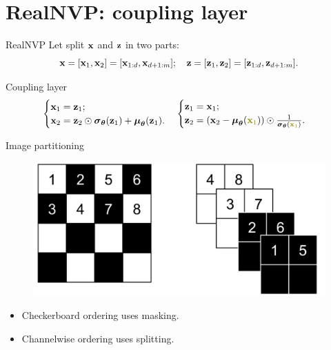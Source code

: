 \section{RealNVP: coupling layer}
\begin{frame}{RealNVP}
	\vspace{-0.5cm}
	Let split $\mathbf{x}$ and $\mathbf{z}$ in two parts: 
	\[
		\mathbf{x} = [\mathbf{x}_1, \mathbf{x}_2] = [\mathbf{x}_{1:d}, \mathbf{x}_{d+1:m}]; \quad \mathbf{z} = [\mathbf{z}_1, \mathbf{z}_2] = [\mathbf{z}_{1:d}, \mathbf{z}_{d+1:m}].
	\]
	\vspace{-0.7cm}
	\begin{block}{Coupling layer}
		\vspace{-0.7cm}
		\[
			\begin{cases} \bx_1 = \bz_1; \\ \bx_2 = \bz_2 \odot \bsigma_{\btheta}(\bz_1) + \bmu_{\btheta}(\bz_1).\end{cases}  
			\begin{cases} \bz_1 = \bx_1; \\ \bz_2 = \left(\bx_2 - \bmu_{\btheta}({\color{olive}\bx_1}) \right) \odot \frac{1}{\bsigma_{\btheta}({\color{olive}\bx_1})}.\end{cases}
		\]
	\end{block}
	\vspace{-0.5cm}
	\begin{block}{Image partitioning}
		
		\begin{minipage}[t]{0.5\columnwidth}
			\begin{figure}
				\centering
				\includegraphics[width=\linewidth]{figs/realnvp_masking.png}
			\end{figure}
		\end{minipage}%
		\begin{minipage}[t]{0.5\columnwidth}
			\begin{itemize}
				\item Checkerboard ordering uses masking.
				\item Channelwise ordering uses splitting.
			\end{itemize}
		\end{minipage}
	\end{block}
	\vspace{-0.5cm}
\end{frame}
